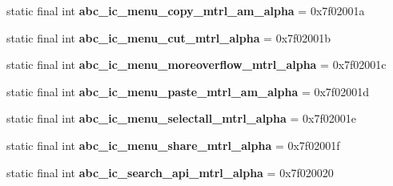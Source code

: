 \begin{DoxyCompactItemize}
\item 
\hypertarget{classandroid_1_1support_1_1v7_1_1appcompat_1_1_r_1_1drawable_a7ee599d758a1ef263faa985737c3a031}{}static final int {\bfseries abc\+\_\+ic\+\_\+menu\+\_\+copy\+\_\+mtrl\+\_\+am\+\_\+alpha} = 0x7f02001a\label{classandroid_1_1support_1_1v7_1_1appcompat_1_1_r_1_1drawable_a7ee599d758a1ef263faa985737c3a031}

\item 
\hypertarget{classandroid_1_1support_1_1v7_1_1appcompat_1_1_r_1_1drawable_a58b0dda1d7f5be83c45d2df10d54586b}{}static final int {\bfseries abc\+\_\+ic\+\_\+menu\+\_\+cut\+\_\+mtrl\+\_\+alpha} = 0x7f02001b\label{classandroid_1_1support_1_1v7_1_1appcompat_1_1_r_1_1drawable_a58b0dda1d7f5be83c45d2df10d54586b}

\item 
\hypertarget{classandroid_1_1support_1_1v7_1_1appcompat_1_1_r_1_1drawable_ae8fd7e8aa4de33987f74658697285a13}{}static final int {\bfseries abc\+\_\+ic\+\_\+menu\+\_\+moreoverflow\+\_\+mtrl\+\_\+alpha} = 0x7f02001c\label{classandroid_1_1support_1_1v7_1_1appcompat_1_1_r_1_1drawable_ae8fd7e8aa4de33987f74658697285a13}

\item 
\hypertarget{classandroid_1_1support_1_1v7_1_1appcompat_1_1_r_1_1drawable_ada8719a6a441014d76e46dc8ab2d6dbf}{}static final int {\bfseries abc\+\_\+ic\+\_\+menu\+\_\+paste\+\_\+mtrl\+\_\+am\+\_\+alpha} = 0x7f02001d\label{classandroid_1_1support_1_1v7_1_1appcompat_1_1_r_1_1drawable_ada8719a6a441014d76e46dc8ab2d6dbf}

\item 
\hypertarget{classandroid_1_1support_1_1v7_1_1appcompat_1_1_r_1_1drawable_a9303126c0d13cb9eadc0ef16815e5584}{}static final int {\bfseries abc\+\_\+ic\+\_\+menu\+\_\+selectall\+\_\+mtrl\+\_\+alpha} = 0x7f02001e\label{classandroid_1_1support_1_1v7_1_1appcompat_1_1_r_1_1drawable_a9303126c0d13cb9eadc0ef16815e5584}

\item 
\hypertarget{classandroid_1_1support_1_1v7_1_1appcompat_1_1_r_1_1drawable_a5528a05a387844af88152f610dbfe24b}{}static final int {\bfseries abc\+\_\+ic\+\_\+menu\+\_\+share\+\_\+mtrl\+\_\+alpha} = 0x7f02001f\label{classandroid_1_1support_1_1v7_1_1appcompat_1_1_r_1_1drawable_a5528a05a387844af88152f610dbfe24b}

\item 
\hypertarget{classandroid_1_1support_1_1v7_1_1appcompat_1_1_r_1_1drawable_aa3433a9a6419e5e27f82325ef9805120}{}static final int {\bfseries abc\+\_\+ic\+\_\+search\+\_\+api\+\_\+mtrl\+\_\+alpha} = 0x7f020020\label{classandroid_1_1support_1_1v7_1_1appcompat_1_1_r_1_1drawable_aa3433a9a6419e5e27f82325ef9805120}


\end{DoxyCompactItemize}
